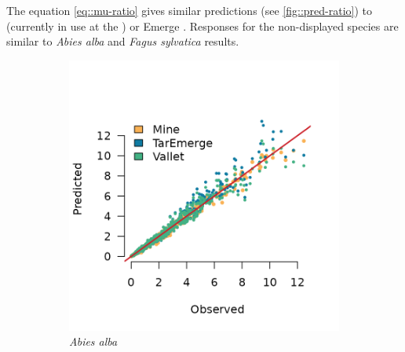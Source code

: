 The equation \eqref{eq::mu-ratio} gives similar predictions (see \ref{fig::pred-ratio}) to \cite{Vallet2006} (currently in use at the \NFI) or Emerge \parencite{Deleuze2014}. Responses for the non-displayed species are similar to \textit{Abies alba} and \textit{Fagus sylvatica} results.
\begin{figure}[h]
	\centering
	\begin{subfigure}{0.4\textwidth}
		\includegraphics{./Figures/abiesAlba-pred.png}
		\caption{\textit{Abies alba}}
	\end{subfigure}
	\hfil
	\begin{subfigure}{0.4\textwidth}

\end{subfigure}
\end{figure}
